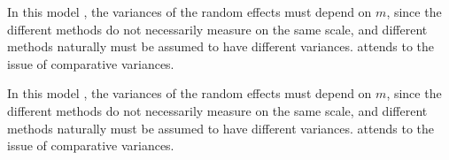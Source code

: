 


In this model , the variances of the random effects must depend on
$m$, since the different methods do not necessarily measure on the
same scale, and different methods naturally must be assumed to
have different variances. \citet{BXC2004} attends to the issue of
comparative variances.



\newpage



\newpage

In this model , the variances of the random effects must depend on
$m$, since the different methods do not necessarily measure on the
same scale, and different methods naturally must be assumed to
have different variances. \citet{BXC2004} attends to the issue of
comparative variances.



\newpage
